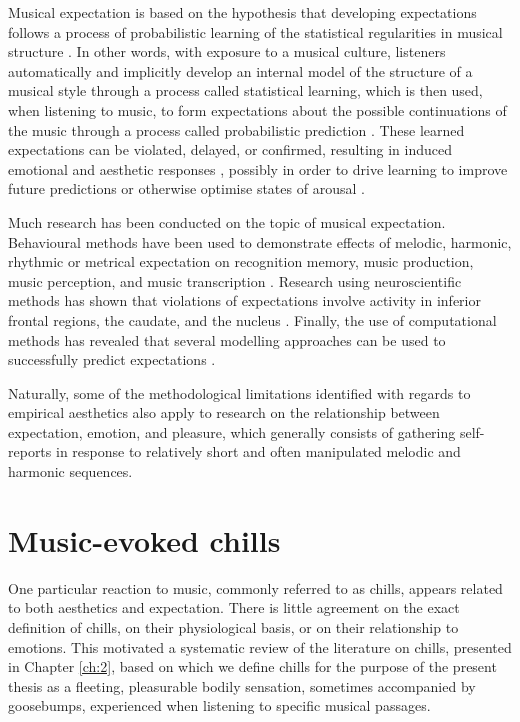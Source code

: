 Musical expectation is based on the hypothesis that developing expectations follows a process of probabilistic learning of the statistical regularities in musical structure \parencite{pearce2018, saffran1999}. In other words, with exposure to a musical culture, listeners automatically and implicitly develop an internal model of the structure of a musical style through a process called statistical learning, which is then used, when listening to music, to form expectations about the possible continuations of the music through a process called probabilistic prediction \parencite{pearce2018}. These learned expectations can be violated, delayed, or confirmed, resulting in induced emotional and aesthetic responses \parencite{cheung2019, egermann2013, gold2019, huron2006, juslin2013, sauve2018, steinbeis2006}, possibly in order to drive learning to improve future predictions or otherwise optimise states of arousal \parencite{pearce2018}. 

Much research has been conducted on the topic of musical expectation. Behavioural methods have been used to demonstrate effects of melodic, harmonic, rhythmic or metrical expectation on recognition memory, music production, music perception, and music transcription \parencite[for a review, see][]{pearce2012}. Research using neuroscientific methods has shown that violations of expectations involve activity in inferior frontal regions, the caudate, and the nucleus \parencite[for reviews, see][]{salimpoor2015, trainor2016}. Finally, the use of computational methods has revealed that several modelling approaches can be used to successfully predict expectations \parencite[for a review, see][]{rohrmeier2012}. 

Naturally, some of the methodological limitations identified with regards to empirical aesthetics also apply to research on the relationship between expectation, emotion, and pleasure, which generally consists of gathering self-reports in response to relatively short \parencite{cheung2019} and often manipulated \parencite{gold2019, sauve2018, steinbeis2006} melodic and harmonic sequences.

\section{Music-evoked chills}    

One particular reaction to music, commonly referred to as chills, appears related to both aesthetics and expectation. There is little agreement on the exact definition of chills, on their physiological basis, or on their relationship to emotions. This motivated a systematic review of the literature on chills, presented in Chapter \ref{ch:2}, based on which we define chills for the purpose of the present thesis as a fleeting, pleasurable bodily sensation, sometimes accompanied by goosebumps, experienced when listening to specific musical passages. 

